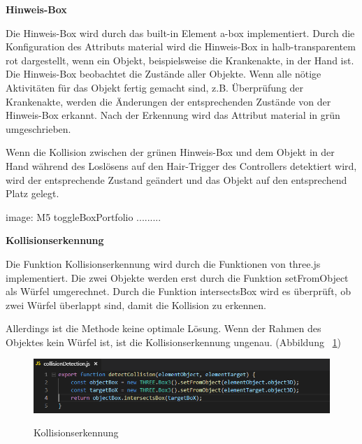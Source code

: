   \vspace{1em}
  \noindent
  \textbf{Hinweis-Box}
  \vspace{1em}
  
  \noindent
  Die Hinweis-Box wird durch das built-in Element {\selectfont a-box} implementiert. Durch die Konfiguration des Attributs {\selectfont material} wird die Hinweis-Box in halb-transparentem rot dargestellt, wenn ein Objekt, beispielsweise die Krankenakte, in der Hand ist. Die Hinweis-Box beobachtet die Zustände aller Objekte. Wenn alle nötige Aktivitäten für das Objekt fertig gemacht sind, z.B. Überprüfung der Krankenakte, werden die Änderungen der entsprechenden Zustände von der Hinweis-Box erkannt. Nach der Erkennung wird das Attribut {\selectfont material} in grün umgeschrieben.
  
  Wenn die Kollision zwischen der grünen Hinweis-Box und dem Objekt in der Hand während des Loslösens auf den Hair-Trigger des Controllers detektiert wird, wird der entsprechende Zustand geändert und das Objekt auf den entsprechend Platz gelegt.
  
  image: M5 toggleBoxPortfolio .........
  
  \vspace{1em}
  \noindent
  \textbf{Kollisionserkennung}
  \vspace{1em}
  
  \noindent
  Die Funktion Kollisionserkennung wird durch die Funktionen von three.js implementiert. Die zwei Objekte werden erst durch die Funktion {\selectfont setFromObject} als Würfel umgerechnet. Durch die Funktion {\selectfont intersectsBox} wird es überprüft, ob zwei Würfel überlappt sind, damit die Kollision zu erkennen.
  
  Allerdings ist die Methode keine optimale Lösung. Wenn der Rahmen des Objektes kein Würfel ist, ist die Kollisionserkennung ungenau. (Abbildung ~\ref{fig:collisionDetection})
  
\begin{figure}[ht]
\vspace*{1em}
\centering
\caption[Kollisionserkennung]{Kollisionserkennung}
\includegraphics[width=\textwidth]{images/collisionDetection.png}
\label{fig:collisionDetection} 
\end{figure}
  
